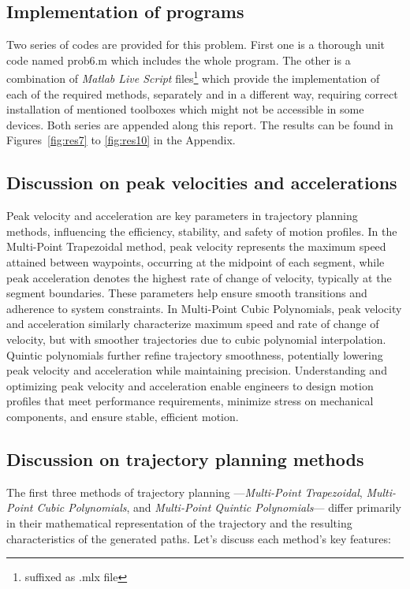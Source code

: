 \documentclass[conference]{IEEEtran}
\begin{document}
\vspace{10px}
\subsection{Implementation of programs}
Two series of codes are provided for this problem. First one is a thorough unit code named prob6.m which includes the whole program. The other is a combination of \textit{Matlab Live Script} files\footnote{suffixed as .mlx file} which provide the implementation of each of the required methods, separately and in a different way, requiring correct installation of mentioned toolboxes which might not be accessible in some devices. Both series are appended along this report. The results can be found in Figures~\ref{fig:res7} to \ref{fig:res10} in the Appendix.

\vspace{10px}
\subsection{Discussion on peak velocities and accelerations}
Peak velocity and acceleration are key parameters in trajectory planning methods, influencing the efficiency, stability, and safety of motion profiles. In the Multi-Point Trapezoidal method, peak velocity represents the maximum speed attained between waypoints, occurring at the midpoint of each segment, while peak acceleration denotes the highest rate of change of velocity, typically at the segment boundaries. These parameters help ensure smooth transitions and adherence to system constraints. In Multi-Point Cubic Polynomials, peak velocity and acceleration similarly characterize maximum speed and rate of change of velocity, but with smoother trajectories due to cubic polynomial interpolation. Quintic polynomials further refine trajectory smoothness, potentially lowering peak velocity and acceleration while maintaining precision. Understanding and optimizing peak velocity and acceleration enable engineers to design motion profiles that meet performance requirements, minimize stress on mechanical components, and ensure stable, efficient motion.

\vspace{10px}
\subsection{Discussion on trajectory planning methods}

The first three methods of trajectory planning —\textit{Multi-Point Trapezoidal}, \textit{Multi-Point Cubic Polynomials}, and \textit{Multi-Point Quintic Polynomials}— differ primarily in their mathematical representation of the trajectory and the resulting characteristics of the generated paths. Let's discuss each method's key features:
\end{document}
